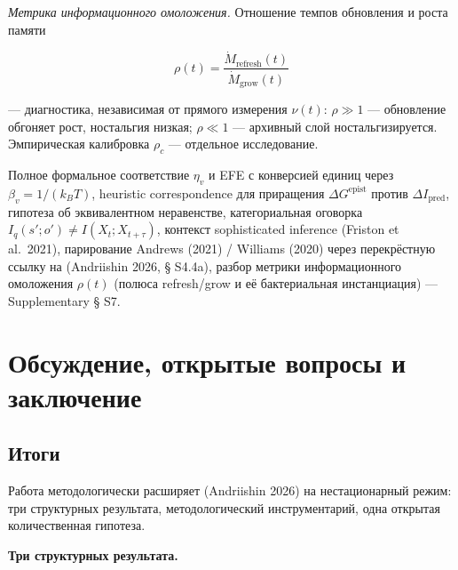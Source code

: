 \documentclass[pdflatex,sn-mathphys-ay]{sn-jnl}
\begin{document}
\emph{Метрика информационного омоложения.} Отношение темпов обновления и роста памяти



\begin{equation}\rho(t) = \frac{\dot{M}_{\text{refresh}}(t)}{\dot{M}_{\text{grow}}(t)} \tag{13}\end{equation}



--- диагностика, независимая от прямого измерения \(\nu(t)\): \(\rho \gg 1\) --- обновление обгоняет рост, ностальгия низкая; \(\rho \ll 1\) --- архивный слой ностальгизируется. Эмпирическая калибровка \(\rho_c\) --- отдельное исследование.



Полное формальное соответствие \(\eta_v\) и EFE с конверсией единиц через \(\beta_v = 1/(k_B T)\), heuristic correspondence для приращения \(\Delta G^{\text{epist}}\) против \(\Delta I_{\text{pred}}\), гипотеза об эквивалентном неравенстве, категориальная оговорка \(I_q(s'; o') \ne I(X_t; X_{t+\tau})\), контекст sophisticated inference (Friston et al.~2021), парирование Andrews (2021) / Williams (2020) через перекрёстную ссылку на (Andriishin 2026, § S4.4a), разбор метрики информационного омоложения \(\rho(t)\) (полюса refresh/grow и её бактериальная инстанциация) --- Supplementary § S7.



\section{Обсуждение, открытые вопросы и заключение}\label{ux43eux431ux441ux443ux436ux434ux435ux43dux438ux435-ux43eux442ux43aux440ux44bux442ux44bux435-ux432ux43eux43fux440ux43eux441ux44b-ux438-ux437ux430ux43aux43bux44eux447ux435ux43dux438ux435}



\subsection{Итоги}\label{ux438ux442ux43eux433ux438}



Работа методологически расширяет (Andriishin 2026) на нестационарный режим: три структурных результата, методологический инструментарий, одна открытая количественная гипотеза.



\textbf{Три структурных результата.}
\end{document}
